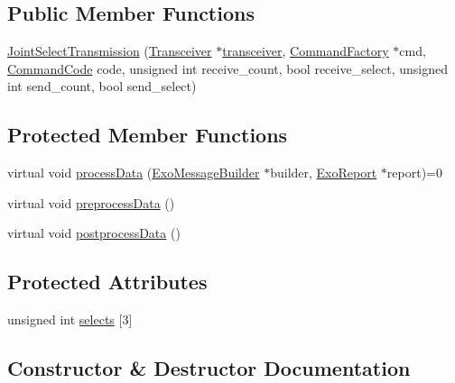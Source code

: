 \subsection*{Public Member Functions}
\begin{DoxyCompactItemize}
\item 
\hyperlink{classJointSelectTransmission_a5c0435e9df344f21123bd43db19d5297}{Joint\+Select\+Transmission} (\hyperlink{classTransceiver}{Transceiver} $\ast$\hyperlink{classTransmission_a4136f9d979a928565232a2d3d6eb5ac5}{transceiver}, \hyperlink{classCommandFactory}{Command\+Factory} $\ast$cmd, \hyperlink{Command__Codes_8hpp_a59210a0ae0b431bbcaba126ab960fd62}{Command\+Code} code, unsigned int receive\+\_\+count, bool receive\+\_\+select, unsigned int send\+\_\+count, bool send\+\_\+select)
\end{DoxyCompactItemize}
\subsection*{Protected Member Functions}
\begin{DoxyCompactItemize}
\item 
virtual void \hyperlink{classJointSelectTransmission_af0fa553b0acc963288c9b2589d242006}{process\+Data} (\hyperlink{classExoMessageBuilder}{Exo\+Message\+Builder} $\ast$builder, \hyperlink{classExoReport}{Exo\+Report} $\ast$report)=0
\item 
virtual void \hyperlink{classJointSelectTransmission_aa07d00b6fe6077fbc019f3c3acb19130}{preprocess\+Data} ()
\item 
virtual void \hyperlink{classJointSelectTransmission_a18339cd55e0e4912f8ef3d0d7e840d3c}{postprocess\+Data} ()
\end{DoxyCompactItemize}
\subsection*{Protected Attributes}
\begin{DoxyCompactItemize}
\item 
unsigned int \hyperlink{classJointSelectTransmission_ad36b0b411323435da1eeb48de88f75e6}{selects} \mbox{[}3\mbox{]}
\end{DoxyCompactItemize}


\subsection{Constructor \& Destructor Documentation}
